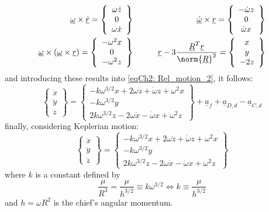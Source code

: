 	\begin{align*}
	\underline{\omega}\times \underline{\dot{r}} = 
	\left\{ \begin{array}{c}
	\omega \dot{z} \\
	0 \\
	\omega \dot{x}
	\end{array}\right\} 
	& \qquad &
	\underline{\dot{\omega}} \times \underline{r} = 
	\left\{ \begin{array}{c}
	-\dot{\omega} z\\
	0 \\
	\dot{\omega} x
	\end{array}\right\} 
	\\
	\underline{\omega}\times\left(\underline{\omega} \times\underline{r}\right) = 
	\left\{ \begin{array}{c}
	- \omega^2 x \\
	0 \\
	- \omega^2 z 
	\end{array}\right\} 
	& \qquad &
	\underline{r} - 3 \dfrac{\underline{R}^T \underline{r}}{\norm{\underline{R}}^2} = 
	\left\{ \begin{array}{c}
	x \\
	y \\
	- 2 z 
	\end{array}\right\} 
	\end{align*}
	\noindent and introducing these results into \eqref{eqCh2: 	Rel_motion_2}, it follows:
	\begin{equation}
	\left\{
	\begin{array}{c}
	\ddot{x}\\
	\ddot{y}\\
	\ddot{z}
	\end{array}\right\}
	= 
	\left\{
	\begin{array}{c}
	- k \omega^{3/2} x + 2\omega \dot{z} + \dot{\omega} z + \omega^2 x	\\
	-k \omega^{3/2} y \\
	2k\omega^{3/2} z - 2 \omega \dot{x} - \dot{\omega} x + \omega^2 z
	\end{array}\right\}
	+ \underline{a}_f + \underline{a}_{D, d} - \underline{a}_{C, d}
	\label{eqCh2: Diff_eqs_prox_pert}
	\end{equation}
	\noindent finally, considering Keplerian motion:
	\begin{equation}
	\left\{
	\begin{array}{c}
	\ddot{x}\\
	\ddot{y}\\
	\ddot{z}
	\end{array}\right\}
	= 
	\left\{
	\begin{array}{c}
	- k \omega^{3/2} x + 2\omega \dot{z} + \dot{\omega} z + \omega^2 x	\\
	-k \omega^{3/2} y \\
	2k\omega^{3/2} z - 2 \omega \dot{x} - \dot{\omega} x + \omega^2 z
	\end{array}\right\}
	\label{eqCh2: Diff_eqs_prox}
	\end{equation}
	\noindent where $k$ is a constant defined by 
	\[
	\dfrac{\mu}{R^3} = \dfrac{\mu }{h^{3/2}} \equiv k \omega^{3/2} \Leftrightarrow k \equiv \dfrac{\mu} {h^{3/2}}
	\]
	\indent and $h = \omega R^2$ is the chief's angular momentum.
